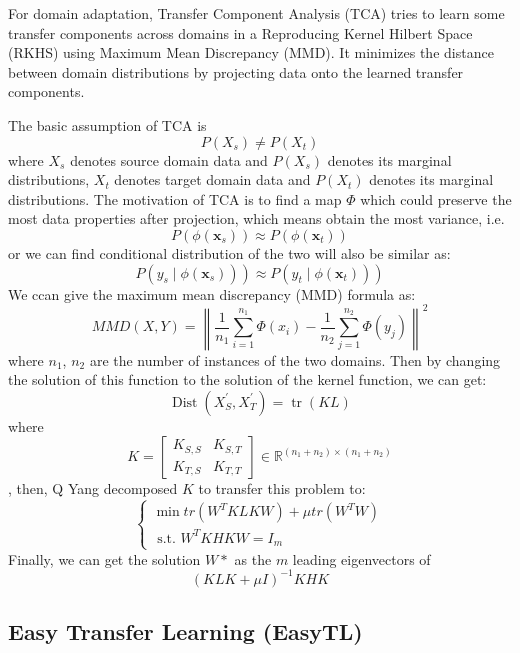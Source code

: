 \documentclass[conference]{IEEEtran}
\begin{document}
For domain adaptation, Transfer Component Analysis (TCA) \cite{Sinno2011Domain} tries to learn some transfer components across domains in a Reproducing Kernel Hilbert Space (RKHS) using Maximum Mean Discrepancy (MMD). It minimizes the distance between domain distributions by projecting data onto the learned transfer components.

The basic assumption of TCA is 
$$P\left(X_{s}\right) \neq P\left(X_{t}\right)$$
where $X_{s}$ denotes source domain data and $P\left(X_{s}\right)$ denotes its marginal distributions, $X_{t}$ denotes target domain data and $P\left(X_{t}\right)$ denotes its marginal distributions. The motivation of TCA is to find a map $\Phi$ which could preserve the most data properties after projection, which means obtain the most variance, i.e.
$$P\left(\phi\left(\mathbf{x}_{s}\right)\right) \approx P\left(\phi\left(\mathbf{x}_{t}\right)\right)$$
or we can find conditional distribution of the two will also be similar as:
$$
\left.\left.P\left(y_{s} \mid \phi\left(\mathbf{x}_{s}\right)\right)\right) \approx P\left(y_{t} \mid \phi\left(\mathbf{x}_{t}\right)\right)\right)
$$
We ccan give the maximum mean discrepancy (MMD) formula as:
$$
M M D(X, Y)=\left\|\frac{1}{n_{1}} \sum_{i=1}^{n_{1}} \Phi\left(x_{i}\right)-\frac{1}{n_{2}} \sum_{j=1}^{n_{2}} \Phi\left(y_{j}\right)\right\|^{2}
$$
where $n_1$, $n_2$ are the number of instances of the two domains. Then by changing the solution of this function to the solution of the kernel function, we can get: 
$$
\operatorname{Dist}\left(X_{S}^{\prime}, X_{T}^{\prime}\right)=\operatorname{tr}(K L)
$$
where
$$
K=\left[\begin{array}{ll}
K_{S, S} & K_{S, T} \\
K_{T, S} & K_{T, T}
\end{array}\right] \in \mathbb{R}^{\left(n_{1}+n_{2}\right) \times\left(n_{1}+n_{2}\right)}
$$,
then, Q Yang\cite{Sinno2011Domain} decomposed $K$ to transfer this problem to:
$$
\left\{\begin{array}{l}
\min t r\left(W^{T} K L K W\right)+\mu t r\left(W^{T} W\right) \\
\text { s.t. } W^{T} K H K W=I_{m}
\end{array}\right.
$$
Finally, we can get the solution $W*$ as the $m$ leading eigenvectors of
$$
(K L K+\mu I)^{-1} K H K
$$

\subsection{Easy Transfer Learning (EasyTL)}
\end{document}
